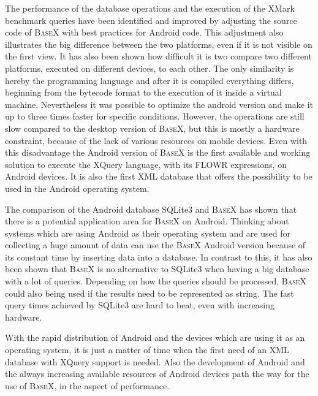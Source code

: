 The performance of the database operations and the execution of the XMark benchmark queries have been identified and improved by adjusting the source code of \textsc{BaseX} with best practices for Android code.
This adjustment also illustrates the big difference between the two platforms, even if it is not visible on the first view.
It has also been shown how difficult it is two compare two different platforms, executed on different devices, to each other.
The only similarity is hereby the programming language and after it is compiled everything differs, beginning from the bytecode format to the execution of it inside a virtual machine.
Nevertheless it was possible to optimize the android version and make it up to three times faster for specific conditions.
However, the operations are still slow compared to the desktop version of \textsc{BaseX}, but this is mostly a hardware constraint, because of the lack of various resources on mobile devices.
Even with this disadvantage the Android version of \textsc{BaseX} is the first available and working solution to execute the XQuery language, with its FLOWR expressions, on Android devices.
It is also the first XML database that offers the possibility to be used in the Android operating system.


The comparison of the Android database SQLite3 and \textsc{BaseX} has shown that there is a potential application area for \textsc{BaseX} on Android.
Thinking about systems which are using Android as their operating system and are used for collecting a huge amount of data can use the \textsc{BaseX} Android version because of its constant time by inserting data into a database. 
In contrast to this, it has also been shown that \textsc{BaseX} is no alternative to SQLite3 when having a big database with a lot of queries.
Depending on how the queries should be processed, \textsc{BaseX} could also being used if the results need to be represented as string.
The fast query times achieved by SQLite3 are hard to beat, even with increasing hardware.





With the rapid distribution of Android and the devices which are using it as an operating system, it is just a matter of time when the first need of an XML database with XQuery support is needed.
Also the development of Android and the always increasing available resources of Android devices path the way for the use of \textsc{BaseX}, in the aspect of performance.




